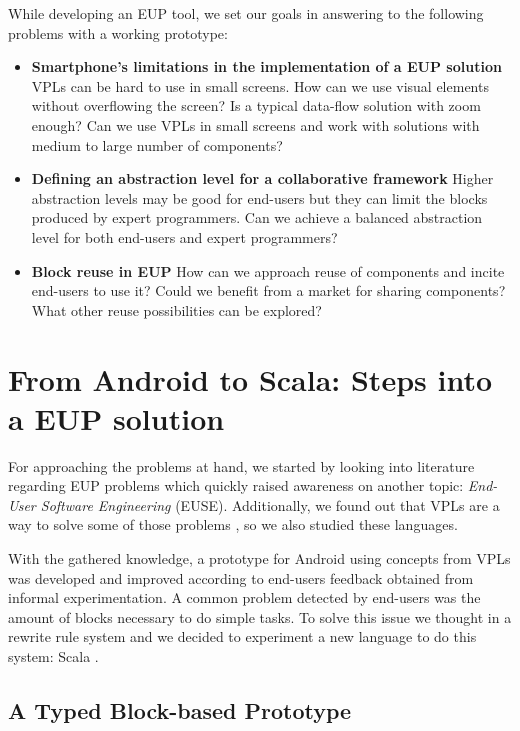 \documentclass[9pt,a4paper]{extarticle}
\begin{document}
\begin{multicols}{2}
While developing an EUP tool, we set our goals in answering to the following problems with a working prototype:

\begin{itemize}
	\item{\textbf{Smartphone's limitations in the implementation of a EUP solution}
    VPLs can be hard to use in small screens. How can we use visual elements without overflowing the screen? Is a typical data-flow solution with zoom enough? Can we use VPLs in small screens and work with solutions with medium to large number of components?}
	
	\item{\textbf{Defining an abstraction level for a collaborative framework}
	Higher abstraction levels may be good for end-users but they can limit the blocks produced by expert programmers. Can we achieve a balanced abstraction level for both end-users and expert programmers?}
  
	\item{\textbf{Block reuse in EUP} 
    How can we approach reuse of components and incite end-users to use it?
    Could we benefit from a market for sharing components? What other reuse possibilities can be explored?}
	
\end{itemize}

\section{From Android to Scala: Steps into a EUP solution}\label{sec:work}

For approaching the problems at hand, we started by looking into literature regarding EUP problems \cite{Barriers2004} which quickly raised awareness on another topic: \emph{End-User Software Engineering} (EUSE).
Additionally, we found out that VPLs are a way to solve some of those problems \cite{Navarro2001}, so we also studied these languages.

With the gathered knowledge, a prototype for Android using concepts from VPLs was developed and improved according to end-users feedback obtained from informal experimentation. 
A common problem detected by end-users was the amount of blocks necessary to do simple tasks. To solve this issue we thought in a rewrite rule system and we decided to experiment a new language to do this system: Scala \cite{ProgrammingScala}.

\subsection{A Typed Block-based Prototype}


\end{multicols}
\end{document}
